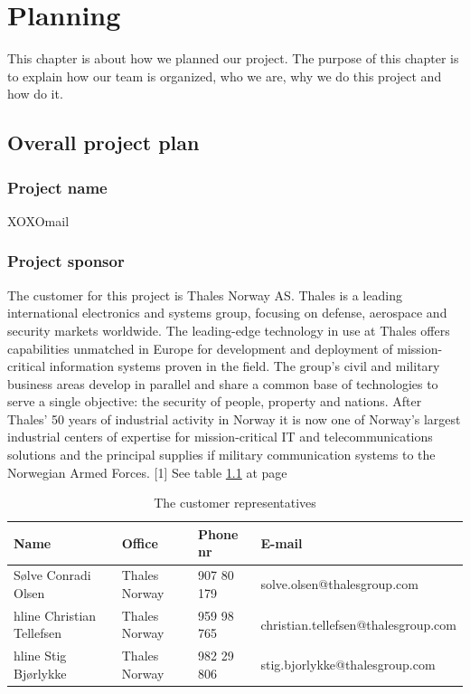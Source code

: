 \chapter{Planning}

This chapter is about how we planned our project. The purpose of this chapter is to explain how our team is organized, who we are, why we do this project and how do it.

\section{Overall project plan}

\subsection{Project name}
XOXOmail

\subsection{Project sponsor}

The customer for this project is Thales Norway AS. Thales is a leading international electronics and systems group, focusing on defense, aerospace and security markets worldwide. The leading-edge technology in use at Thales offers capabilities unmatched in Europe for development and deployment of mission-critical information systems proven in the field. The group’s civil and military business areas develop in parallel and share a common base of technologies to serve a single objective: the security of people, property and nations.
\newline
\newline
After Thales’ 50 years of industrial activity in Norway it is now one of Norway’s largest industrial centers of expertise for mission-critical IT and telecommunications solutions and the principal supplies if military communication systems to the Norwegian Armed Forces. [1]
\newline
\newline
See table \ref{tab:customer} at page \pageref{tab:customer}
\begin{table}
\begin{tabular}{l|l|l|l}
\textbf{Name} & \textbf{Office} & \textbf{Phone nr} & \textbf{E-mail} \\ \hline \hline
Sølve Conradi Olsen & Thales Norway & 907 80 179 & solve.olsen@thalesgroup.com \\ hline
Christian Tellefsen & Thales Norway & 959 98 765 & christian.tellefsen@thalesgroup.com \\ hline
Stig Bjørlykke & Thales Norway & 982 29 806 & stig.bjorlykke@thalesgroup.com
\end{tabular}
\caption{The customer representatives} \label{tab:customer}
\end{table}

